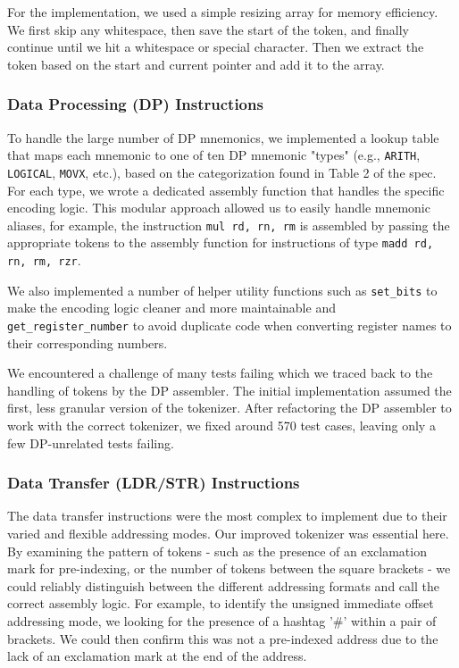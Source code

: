 \documentclass[11pt]{article}
\begin{document}
For the implementation, we used a simple resizing array for memory efficiency.
We first skip any whitespace, then save the start of the token, and finally continue until we hit a whitespace or special character.
Then we extract the token based on the start and current pointer and add it to the array.

\subsubsection{Data Processing (DP) Instructions}
To handle the large number of DP mnemonics, we implemented a lookup table that maps each mnemonic to one of ten DP mnemonic "types" 
(e.g., \texttt{ARITH}, \texttt{LOGICAL}, \texttt{MOVX}, etc.), based on the categorization found in Table 2 of the spec.
For each type, we wrote a dedicated assembly function that handles the specific encoding logic. 
This modular approach allowed us to easily handle mnemonic aliases, for example, the instruction \texttt{mul rd, rn, rm} is 
assembled by passing the appropriate tokens to the assembly function for instructions of type \texttt{madd rd, rn, rm, rzr}.

We also implemented a number of helper utility functions such as \texttt{set\_bits} to make the encoding logic cleaner and more maintainable
and \texttt{get\_register\_number} to avoid duplicate code when converting register names to their corresponding numbers.

We encountered a challenge of many tests failing which we traced back to the handling of tokens by the DP assembler. 
The initial implementation assumed the first, less granular version of the tokenizer.
After refactoring the DP assembler to work with the correct tokenizer, we fixed around 570 test cases, leaving only a few DP-unrelated tests failing.

\subsubsection{Data Transfer (LDR/STR) Instructions}
The data transfer instructions were the most complex to implement due to their varied and flexible addressing modes. Our improved tokenizer was essential here. By examining the pattern of tokens - such as the presence of an exclamation mark for pre-indexing, or the number of tokens between the square brackets - we could reliably distinguish between the different addressing formats and call the correct assembly logic.
For example, to identify the unsigned immediate offset addressing mode, we looking for the presence of a hashtag '\#' within a pair of brackets. We could then confirm this was not a pre-indexed address due to the lack of an exclamation mark at the end of the address.
\end{document}
